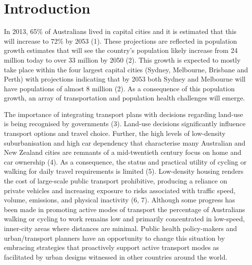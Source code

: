 \documentclass[final,3p,times,authoryear]{elsarticle}
\begin{document}








\section{Introduction}\label{sec:introduction}


In 2013, 65\% of Australians lived in capital cities and it is estimated that this will increase to 72\% by 2053  (1). These projections are reflected in population growth estimates that will see the country’s population likely increase from 24 million today to over 33 million by 2050  (2). This growth is expected to mostly take place within the four largest capital cities (Sydney, Melbourne, Brisbane and Perth) with projections indicating that by 2053 both Sydney and Melbourne will have populations of almost 8 million  (2). As a consequence of this population growth, an array of transportation and population health challenges will emerge.

The importance of integrating transport plans with decisions regarding land-use is being recognised by governments (3). Land-use decisions significantly influence transport options and travel choice. Further, the high levels of low-density suburbanisation and high car dependency that characterise many Australian and New Zealand cities are remnants of a mid-twentieth century focus on home and car ownership (4). As a consequence, the status and practical utility of cycling or walking for daily travel requirements is limited (5). Low-density housing renders the cost of large-scale public transport prohibitive, producing a reliance on private vehicles and increasing exposure to risks associated with traffic speed, volume, emissions, and physical inactivity  (6, 7). Although some progress has been made in promoting active modes of transport the percentage of Australians walking or cycling to work remains low and primarily concentrated in low-speed, inner-city areas where distances are minimal. Public health policy-makers and urban/transport planners have an opportunity to change this situation by embracing strategies that proactively support active transport modes as facilitated by urban designs witnessed in other countries around the world.
\end{document}
